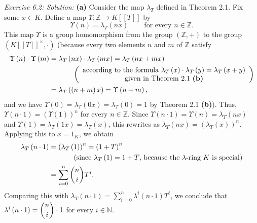 \documentclass[numbers=enddot,12pt,final,onecolumn,notitlepage]{scrartcl}%
\begin{document}
\textit{Exercise 6.2: Solution:} \textbf{(a)} Consider the map $\lambda_{T}$
defined in Theorem 2.1. Fix some $x\in K$. Define a map $\Upsilon
:\mathbb{Z}\rightarrow K\left[  \left[  T\right]  \right]  $ by%
\[
\Upsilon\left(  n\right)  =\lambda_{T}\left(  nx\right)
\ \ \ \ \ \ \ \ \ \ \text{for every }n\in\mathbb{Z}\text{.}%
\]
This map $\Upsilon$ is a group homomorphism from the group $\left(
\mathbb{Z},+\right)  $ to the group $\left(  K\left[  \left[  T\right]
\right]  ^{\times},\cdot\right)  $ (because every two elements $n$ and $m$ of
$\mathbb{Z}$ satisfy
\begin{align*}
\Upsilon\left(  n\right)  \cdot\Upsilon\left(  m\right)   &  =\lambda
_{T}\left(  nx\right)  \cdot\lambda_{T}\left(  mx\right)  =\lambda_{T}\left(
nx+mx\right) \\
&  \ \ \ \ \ \ \ \ \ \ \left(
\begin{array}
[c]{c}%
\text{according to the formula }\lambda_{T}\left(  x\right)  \cdot\lambda
_{T}\left(  y\right)  =\lambda_{T}\left(  x+y\right) \\
\text{given in Theorem 2.1 \textbf{(b)}}%
\end{array}
\right) \\
&  =\lambda_{T}\left(  \left(  n+m\right)  x\right)  =\Upsilon\left(
n+m\right)  ,
\end{align*}
and we have $\Upsilon\left(  0\right)  =\lambda_{T}\left(  0x\right)
=\lambda_{T}\left(  0\right)  =1$ by Theorem 2.1 \textbf{(b)}). Thus,
$\Upsilon\left(  n\cdot1\right)  =\left(  \Upsilon\left(  1\right)  \right)
^{n}$ for every $n\in\mathbb{Z}$. Since $\Upsilon\left(  n\cdot1\right)
=\Upsilon\left(  n\right)  =\lambda_{T}\left(  nx\right)  $ and $\Upsilon
\left(  1\right)  =\lambda_{T}\left(  1x\right)  =\lambda_{T}\left(  x\right)
$, this rewrites as $\lambda_{T}\left(  nx\right)  =\left(  \lambda_{T}\left(
x\right)  \right)  ^{n}$. Applying this to $x=1_{K}$, we obtain%
\begin{align*}
\lambda_{T}\left(  n\cdot1\right)   &  =\left(  \lambda_{T}\left(  1\right)
\right)  ^{n}=\left(  1+T\right)  ^{n}\\
&  \ \ \ \ \ \ \ \ \ \ \left(  \text{since }\lambda_{T}\left(  1\right)
=1+T\text{, because the }\lambda\text{-ring }K\text{ is special}\right) \\
&  =\sum_{i=0}^{n}\dbinom{n}{i}T^{i}.
\end{align*}
Comparing this with $\lambda_{T}\left(  n\cdot1\right)  =\sum\limits_{i=0}%
^{n}\lambda^{i}\left(  n\cdot1\right)  T^{i}$, we conclude that $\lambda
^{i}\left(  n\cdot1\right)  =\dbinom{n}{i}\cdot1$ for every $i\in\mathbb{N}$.
\end{document}
